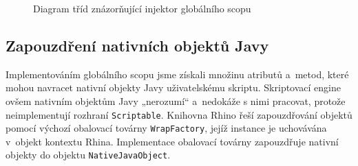 \begin{figure}[H]
  \begin{center}
    \caption{Diagram tříd znázorňující injektor globálního scopu}
    \label{Figure.ClassObjectsInjector}
  \end{center}
\end{figure}

\vspace{-3em}

\subsection{Zapouzdření nativních objektů Javy}
\label{Chapter.Implementation.NativeJavaWrappers}

Implementováním globálního scopu jsme získali množinu atributů a~metod, které mohou navracet nativní objekty Javy uživatelskému skriptu. Skriptovací engine ovšem nativním objektům Javy „nerozumí“ a~nedokáže s nimi pracovat, protože neimplementují rozhraní \texttt{Scriptable}. Knihovna Rhino řeší zapouzdřování objektů pomocí výchozí obalovací továrny \texttt{WrapFactory}, jejíž instance je uchovávána v~objekt kontextu Rhina. Implementace obalovací továrny zapouzdřuje nativní objekty do objektu \texttt{NativeJavaObject}.

